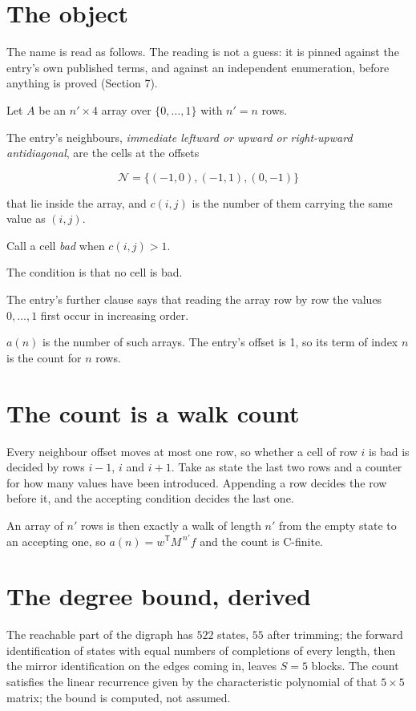 \documentclass[11pt]{article}
\theoremstyle{definition}
\begin{document}
\section{The object}

The name is read as follows. The reading is not a guess: it is pinned against the entry's own published terms, and against an independent enumeration, before anything is proved (Section 7).

Let $A$ be an $n' \times 4$ array over $\{0,\dots,1\}$ with $n' = n$ rows.

The entry's neighbours, {\itshape immediate leftward or upward or right-upward antidiagonal}, are the cells at the offsets

\[\mathcal{N} = \{(-1,0), (-1,1), (0,-1)\}\]

that lie inside the array, and $c(i,j)$ is the number of them carrying the same value as $(i,j)$.

Call a cell {\itshape bad} when $c(i,j) > 1$.

The condition is that no cell is bad.

The entry's further clause says that reading the array row by row the values $0,\dots,1$ first occur in increasing order.

$a(n)$ is the number of such arrays. The entry's offset is 1, so its term of index $n$ is the count for $n$ rows.

\section{The count is a walk count}

Every neighbour offset moves at most one row, so whether a cell of row $i$ is bad is decided by rows $i-1$, $i$ and $i+1$. Take as state the last two rows and a counter for how many values have been introduced. Appending a row decides the row before it, and the accepting condition decides the last one.

An array of $n'$ rows is then exactly a walk of length $n'$ from the empty state to an accepting one, so $a(n) = w^{\mathsf T}M^{\,n'}f$ and the count is C-finite.

\section{The degree bound, derived}

The reachable part of the digraph has $522$ states, $55$ after trimming; the forward identification of states with equal numbers of completions of every length, then the mirror identification on the edges coming in, leaves $S = 5$ blocks. The count satisfies the linear recurrence given by the characteristic polynomial of that $5\times5$ matrix; the bound is computed, not assumed.
\end{document}
